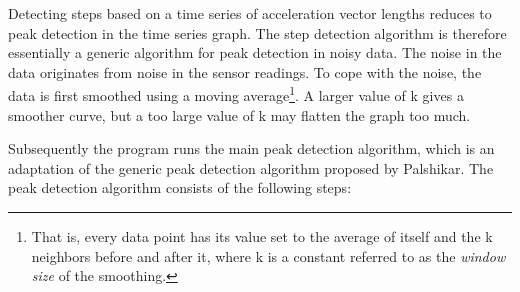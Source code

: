Detecting steps based on a time series of acceleration vector lengths reduces to peak detection in the time series graph. The step detection algorithm is therefore essentially a generic algorithm for peak detection in noisy data. The noise in the data originates from noise in the sensor readings. To cope with the noise, the data is first smoothed using a moving average\footnote{That is, every data point has its value set to the average of itself and the k neighbors before and after it, where k is a constant referred to as the \emph{window size} of the smoothing.}. A larger value of k gives a smoother curve, but a too large value of k may flatten the graph too much.

Subsequently the program runs the main peak detection algorithm, which is an adaptation of the generic peak detection algorithm proposed by Palshikar\cite{stepDetection}. The peak detection algorithm consists of the following steps:
